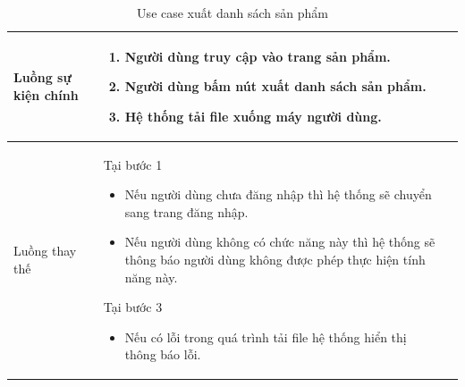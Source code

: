 \documentclass[12pt,a4paper]{article}
\begin{document}
\begin{table}[H]
\begin{tabular}{|p{3.5cm}|p{11.5cm}|c|}
            Luồng sự kiện chính & \vspace{-.8cm}\begin{enumerate}
                                                    \item Người dùng truy cập vào trang sản phẩm.
                                                    \item Người dùng bấm nút xuất danh sách sản phẩm.
                                                    \item Hệ thống tải file xuống máy người dùng.
            \end{enumerate}
            \\
            \hline
            Luồng thay thế & Tại bước 1\newline
            \vspace{-.8cm}\begin{itemize}
                              \item Nếu người dùng chưa đăng nhập thì hệ thống sẽ chuyển sang trang đăng nhập.
                              \item Nếu người dùng không có chức năng này thì hệ thống sẽ thông báo người dùng không được phép thực hiện tính năng này.
            \end{itemize}
            Tại bước 3\newline
            \vspace{-.8cm}\begin{itemize}
                              \item Nếu có lỗi trong quá trình tải file hệ thống hiển thị thông báo lỗi.
            \end{itemize}
            \\ \hline
        \end{tabular}
        \caption{Use case xuất danh sách sản phẩm}

    \end{table}

\end{document}
